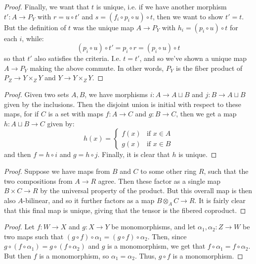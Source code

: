 \documentclass[12pt]{exam}
\begin{document}
\begin{proof}
	Finally, we want that $t$ is unique, i.e. if we have another morphism $t' : A \to P_Y$ with $r = u \circ t'$ and $s = (f_i \circ p_i \circ u) \circ t$, then we want to show $t' = t$. But the definition of $t$ was the unique map $A \to P_Y$ with $h_i = (p_i \circ u) \circ t$ for each $i$, while:
	\[ (p_i \circ u) \circ t' = p_i \circ r = (p_i \circ u) \circ t \]
	so that $t'$ also satisfies the criteria. I.e. $t = t'$, and so we've shown a unique map $A \to P_Y$ making the above commute. In other words, $P_Y$ is the fiber product of $P_Z \to Y \times_Z Y$ and $Y \to Y \times_Z Y$.
\end{proof}

\begin{proof}
	Given two sets $A,B$, we have morphisms $i : A \to A \sqcup B$ and $j : B \to A \sqcup B$ given by the inclusions. Then the disjoint union is initial with respect to these maps, for if $C$ is a set with maps $f : A \to C$ and $g : B \to C$, then we get a map $h : A \sqcup B \to C$ given by:
	\[ h(x) = \begin{cases} f(x) & \text{if }x \in A \\ g(x) & \text{if }x \in B \end{cases} \]
	and then $f = h \circ i$ and $g = h \circ j$. Finally, it is clear that $h$ is unique.
\end{proof}

\begin{proof}
	Suppose we have maps from $B$ and $C$ to some other ring $R$, such that the two compositions from $A \to R$ agree. Then these factor as a single map $B \times C \to R$ by the universal property of the product. But this overall map is then also $A$-bilinear, and so it further factors as a map $B \otimes_A C \to R$. It is fairly clear that this final map is unique, giving that the tensor is the fibered coproduct.
\end{proof}

\begin{proof}
	Let $f : W \to X$ and $g : X \to Y$ be monomorphisms, and let $\alpha_1,\alpha_2 : Z \to W$ be two maps such that $(g \circ f) \circ \alpha_1 = (g \circ f) \circ \alpha_2$. Then, since $g \circ (f \circ \alpha_1) = g \circ (f \circ \alpha_2)$ and $g$ is a monomorphism, we get that $f \circ \alpha_1 = f \circ \alpha_2$. But then $f$ is a monomorphism, so $\alpha_1 = \alpha_2$. Thus, $g \circ f$ is a monomorphism.
\end{proof}
\end{document}
